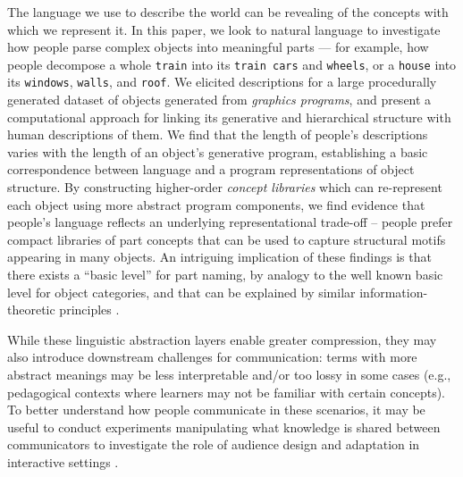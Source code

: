 
The language we use to describe the world can be revealing of the concepts with which we represent it.
In this paper, we look to natural language to investigate how people parse complex objects into meaningful parts --- for example, how people decompose a whole \texttt{train} into its \texttt{train cars} and \texttt{wheels}, or a \texttt{house} into its \texttt{windows}, \texttt{walls}, and \texttt{roof}.
We elicited descriptions for a large procedurally generated dataset of objects generated from \textit{graphics programs}, and present a computational approach for linking its generative and hierarchical structure with human descriptions of them. 
We find that the length of people's descriptions varies with the length of an object's generative program, establishing a basic correspondence between language and a program representations of object structure. 
By constructing higher-order \textit{concept libraries} which can re-represent each object using more abstract program components, we find evidence that people's language reflects an underlying representational trade-off -- people prefer compact libraries of part concepts that can be used to capture structural motifs appearing in many objects. 
An intriguing implication of these findings is that there exists a ``basic level'' for part naming, by analogy to the well known basic level for object categories, and that can be explained by similar information-theoretic principles .

While these linguistic abstraction layers enable greater compression, they may also introduce downstream challenges for communication: terms with more abstract meanings may be less interpretable and/or too lossy in some cases (e.g., pedagogical contexts where learners may not be familiar with certain concepts).
To better understand how people communicate in these scenarios, it may be useful to conduct experiments manipulating what knowledge is shared between communicators to investigate the role of audience design and adaptation in interactive settings .

